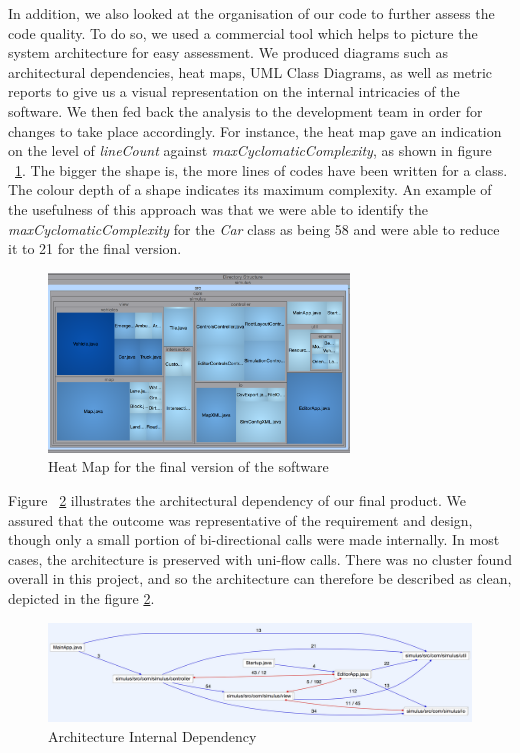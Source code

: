 In addition, we also looked at the organisation of our code to further assess the code quality. To do so, we used a commercial tool which helps to picture the system architecture for easy assessment. We produced diagrams such as architectural dependencies, heat maps, UML Class Diagrams, as well as metric reports to give us a visual representation on the internal intricacies of the software. We then fed back the analysis to the development team in order for changes to take place accordingly. For instance, the heat map gave an indication on the level of \textit{lineCount} against \textit{maxCyclomaticComplexity}, as shown in figure ~\ref{fig:heatmap}. The bigger the shape is, the more lines of codes have been written for a class. The colour depth of a shape indicates its maximum complexity. An example of the usefulness of this approach was that we were able to identify the \textit{maxCyclomaticComplexity} for the \textit{Car} class as being 58 and were able to reduce it to 21 for the final version.     

\begin{figure}[h]
        \begin{minipage}{\textwidth}
                \begin{center}
                                \includegraphics[width=80mm,keepaspectratio ]{img/heatmap.png}
                        \caption{Heat Map for the final version of the software}
                        \label{fig:heatmap}     
                \end{center}
        \end{minipage}
\end{figure}

Figure ~\ref{fig:archIntDependency} illustrates the architectural dependency of our final product. We assured that the outcome was representative of the requirement and design, though only a small portion of bi-directional calls were made internally. In most cases, the architecture is preserved with uni-flow calls. There was no cluster found overall in this project, and so the architecture can therefore be described as clean, depicted in the figure \ref{fig:archIntDependency}. 

\begin{figure}[h]
        \begin{center}
                        \includegraphics[width=\textwidth]{img/archIntDependency.png}
                \caption{Architecture Internal Dependency}
        \label{fig:archIntDependency}
        \end{center}
\end{figure}



\clearpage